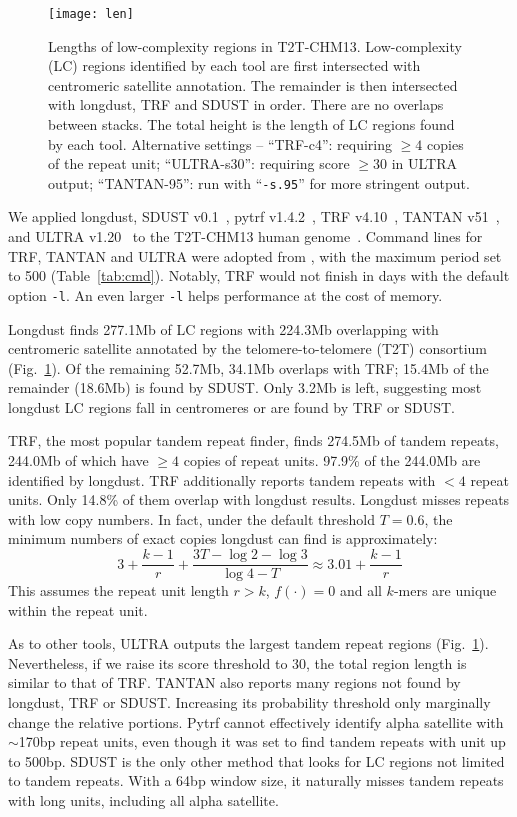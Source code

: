 \documentclass[webpdf,contemporary,large,namedate]{oup-authoring-template}%
\begin{document}
\begin{figure}[tb]
\texttt{[image: len]}
\caption{Lengths of low-complexity regions in T2T-CHM13.
Low-complexity (LC) regions identified by each tool are first intersected with centromeric satellite annotation.
The remainder is then intersected with longdust, TRF and SDUST in order.
There are no overlaps between stacks.
The total height is the length of LC regions found by each tool.
Alternative settings --
``TRF-c4'': requiring $\ge4$ copies of the repeat unit;
``ULTRA-s30'': requiring score $\ge30$ in ULTRA output;
``TANTAN-95'': run with ``{\tt -s.95}'' for more stringent output.
}\label{fig:len}
\end{figure}

We applied longdust, SDUST v0.1~\citep{Morgulis:2006aa},
pytrf v1.4.2~\citep{Du:2025aa},
TRF v4.10~\citep{Benson:1999aa},
TANTAN v51~\citep{Frith:2011aa},
and ULTRA v1.20~\citep{Olson:2024aa}
to the T2T-CHM13 human genome~\citep{Nurk:2022up}.
Command lines for TRF, TANTAN and ULTRA were adopted from \citet{Olson:2024aa},
with the maximum period set to 500 (Table~\ref{tab:cmd}).
Notably, TRF would not finish in days with the default option {\tt -l}.
An even larger {\tt -l} helps performance at the cost of memory.

Longdust finds 277.1Mb of LC regions with 224.3Mb overlapping with centromeric satellite annotated by the telomere-to-telomere (T2T) consortium (Fig.~\ref{fig:len}).
Of the remaining 52.7Mb, 34.1Mb overlaps with TRF; 15.4Mb of the remainder (18.6Mb) is found by SDUST.
Only 3.2Mb is left, suggesting most longdust LC regions fall in centromeres or are found by TRF or SDUST.

TRF, the most popular tandem repeat finder, finds 274.5Mb of tandem repeats,
244.0Mb of which have $\ge4$ copies of repeat units.
97.9\% of the 244.0Mb are identified by longdust.
TRF additionally reports tandem repeats with $<4$ repeat units.
Only 14.8\% of them overlap with longdust results.
Longdust misses repeats with low copy numbers.
In fact, under the default threshold $T=0.6$,
the minimum numbers of exact copies longdust can find is approximately:
$$
3+\frac{k-1}{r}+\frac{3T-\log2-\log3}{\log4-T}\approx3.01+\frac{k-1}{r}
$$
This assumes the repeat unit length $r>k$, $f(\cdot)=0$ and all $k$-mers are unique within the repeat unit.

As to other tools, ULTRA outputs the largest tandem repeat regions (Fig.~\ref{fig:len}).
Nevertheless, if we raise its score threshold to 30,
the total region length is similar to that of TRF.
TANTAN also reports many regions not found by longdust, TRF or SDUST.
Increasing its probability threshold only marginally change the relative portions.
Pytrf cannot effectively identify alpha satellite with $\sim$170bp repeat units,
even though it was set to find tandem repeats with unit up to 500bp.
SDUST is the only other method that looks for LC regions not limited to tandem repeats.
With a 64bp window size, it naturally misses tandem repeats with long units, including all alpha satellite.
\end{document}
